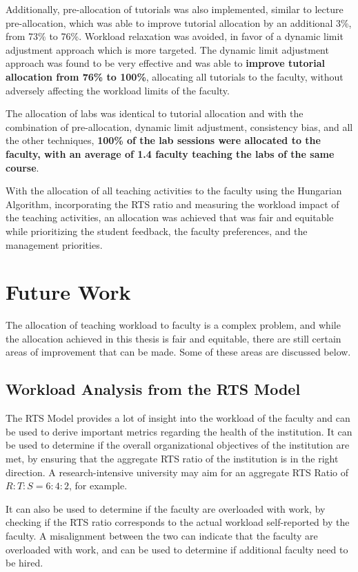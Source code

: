 Additionally, pre-allocation of tutorials was also implemented, similar to lecture pre-allocation, which was able to improve tutorial allocation by an additional 3\%, from 73\% to 76\%. Workload relaxation was avoided, in favor of a dynamic limit adjustment approach which is more targeted. The dynamic limit adjustment approach was found to be very effective and was able to \textbf{improve tutorial allocation from 76\% to 100\%}, allocating all tutorials to the faculty, without adversely affecting the workload limits of the faculty.

The allocation of labs was identical to tutorial allocation and with the combination of pre-allocation, dynamic limit adjustment, consistency bias, and all the other techniques, \textbf{100\% of the lab sessions were allocated to the faculty, with an average of 1.4 faculty teaching the labs of the same course}.

With the allocation of all teaching activities to the faculty using the Hungarian Algorithm, incorporating the RTS ratio and measuring the workload impact of the teaching activities, an allocation was achieved that was fair and equitable while prioritizing the student feedback, the faculty preferences, and the management priorities.

\section{Future Work}

The allocation of teaching workload to faculty is a complex problem, and while the allocation achieved in this thesis is fair and equitable, there are still certain areas of improvement that can be made. Some of these areas are discussed below.

\subsection{Workload Analysis from the RTS Model}

The RTS Model provides a lot of insight into the workload of the faculty and can be used to derive important metrics regarding the health of the institution. It can be used to determine if the overall organizational objectives of the institution are met, by ensuring that the aggregate RTS ratio of the institution is in the right direction. A research-intensive university may aim for an aggregate RTS Ratio of $R:T:S = 6:4:2$, for example.

It can also be used to determine if the faculty are overloaded with work, by checking if the RTS ratio corresponds to the actual workload self-reported by the faculty. A misalignment between the two can indicate that the faculty are overloaded with work, and can be used to determine if additional faculty need to be hired.

